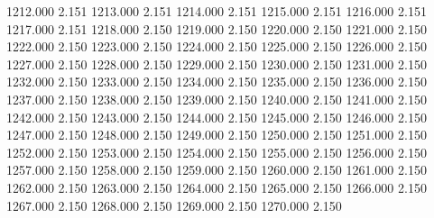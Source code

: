1212.000 2.151 
1213.000 2.151 
1214.000 2.151 
1215.000 2.151 
1216.000 2.151 
1217.000 2.151 
1218.000 2.150 
1219.000 2.150 
1220.000 2.150 
1221.000 2.150 
1222.000 2.150 
1223.000 2.150 
1224.000 2.150 
1225.000 2.150 
1226.000 2.150 
1227.000 2.150 
1228.000 2.150 
1229.000 2.150 
1230.000 2.150 
1231.000 2.150 
1232.000 2.150 
1233.000 2.150 
1234.000 2.150 
1235.000 2.150 
1236.000 2.150 
1237.000 2.150 
1238.000 2.150 
1239.000 2.150 
1240.000 2.150 
1241.000 2.150 
1242.000 2.150 
1243.000 2.150 
1244.000 2.150 
1245.000 2.150 
1246.000 2.150 
1247.000 2.150 
1248.000 2.150 
1249.000 2.150 
1250.000 2.150 
1251.000 2.150 
1252.000 2.150 
1253.000 2.150 
1254.000 2.150 
1255.000 2.150 
1256.000 2.150 
1257.000 2.150 
1258.000 2.150 
1259.000 2.150 
1260.000 2.150 
1261.000 2.150 
1262.000 2.150 
1263.000 2.150 
1264.000 2.150 
1265.000 2.150 
1266.000 2.150 
1267.000 2.150 
1268.000 2.150 
1269.000 2.150 
1270.000 2.150 
